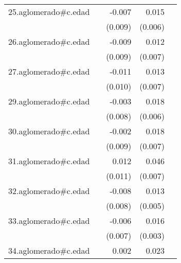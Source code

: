 {\begin{longtable}{l*{4}{D{.}{.}{-1}}}
\addlinespace
25.aglomerado#c.edad&                     &      -0.007         &       0.015\sym{*}  &                     \\
            &                     &     (0.009)         &     (0.006)         &                     \\
\addlinespace
26.aglomerado#c.edad&                     &      -0.009         &       0.012         &                     \\
            &                     &     (0.009)         &     (0.007)         &                     \\
\addlinespace
27.aglomerado#c.edad&                     &      -0.011         &       0.013         &                     \\
            &                     &     (0.010)         &     (0.007)         &                     \\
\addlinespace
29.aglomerado#c.edad&                     &      -0.003         &       0.018\sym{**} &                     \\
            &                     &     (0.008)         &     (0.006)         &                     \\
\addlinespace
30.aglomerado#c.edad&                     &      -0.002         &       0.018\sym{**} &                     \\
            &                     &     (0.009)         &     (0.007)         &                     \\
\addlinespace
31.aglomerado#c.edad&                     &       0.012         &       0.046\sym{***}&                     \\
            &                     &     (0.011)         &     (0.007)         &                     \\
\addlinespace
32.aglomerado#c.edad&                     &      -0.008         &       0.013\sym{**} &                     \\
            &                     &     (0.008)         &     (0.005)         &                     \\
\addlinespace
33.aglomerado#c.edad&                     &      -0.006         &       0.016\sym{***}&                     \\
            &                     &     (0.007)         &     (0.003)         &                     \\
\addlinespace
34.aglomerado#c.edad&                     &       0.002         &       0.023\sym{***}&                     \\

\end{longtable}}

